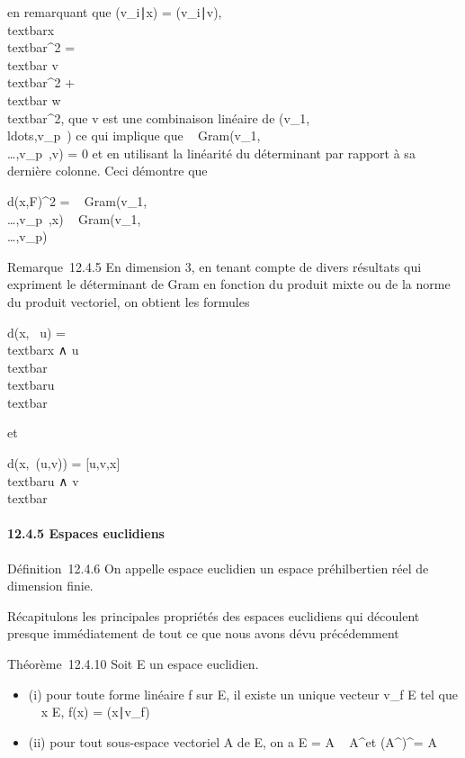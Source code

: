 \documentclass[]{article}
\begin{document}
en remarquant que (v\_i∣x) =
(v\_i∣v),
\\textbar{}x\\textbar{}^2
=\\textbar{} v\\textbar{}^2
+\\textbar{} w\\textbar{}^2,
que v est une combinaison linéaire de
(v\_1,\\ldots,v\_p~)
ce qui implique que
~
Gram(v\_1,\\\ldots,v\_p~,v)
= 0 et en utilisant la linéarité du déterminant par rapport à sa
dernière colonne. Ceci démontre que

d(x,F)^2 =
~
Gram(v\_1,\\\ldots,v\_p~,x)
\over
{}~
Gram(v\_1,\\\ldots,v\_p)~

Remarque~12.4.5 En dimension 3, en tenant compte de divers résultats qui
expriment le déterminant de Gram en fonction du produit mixte ou de la
norme du produit vectoriel, on obtient les formules

d(x, ~u) = \\textbar{}x ∧ u\\textbar{}
\over
\\textbar{}u\\textbar{}

et

d(x,\mathrmVect~(u,v)) =
\big \textbar{} {[}u,v,x{]} \big
\textbar{} \over \\textbar{}u ∧
v\\textbar{}

\paragraph{12.4.5 Espaces euclidiens}

Définition~12.4.6 On appelle espace euclidien un espace préhilbertien
réel de dimension finie.

Récapitulons les principales propriétés des espaces euclidiens qui
découlent presque immédiatement de tout ce que nous avons dé vu
précédemment

Théorème~12.4.10 Soit E un espace euclidien.

\begin{itemize}
\itemsep1pt\parskip0pt
\item
  (i) pour toute forme linéaire f sur E, il existe un unique vecteur
  v\_f \in E tel que \forall~~x \in E, f(x) =
  (x∣v\_f)
\item
  (ii) pour tout sous-espace vectoriel A de E, on a E = A \oplus~
  A^\bot et (A^\bot)^\bot = A
\end{itemize}
\end{document}
